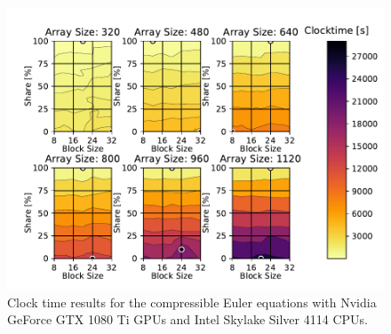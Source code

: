 \documentclass[journal,article,submit,moreauthors,pdftex]{Definitions/mdpi}
\newcommand\fs{1}
\def\oldCPU{Intel Skylake Silver 4114} %
\def\oldGPU{Nvidia GeForce GTX 1080 Ti}
\begin{document}
\begin{figure}
    \widefigure
    \begin{center}
        \includegraphics[scale=\fs, trim={0.5cm 0.4cm 0.5cm 0.2cm},clip]{figs/clockTimeSwepteulerOld.pdf}
        \caption{Clock time results  for the compressible Euler equations with \oldGPU{} GPUs and \oldCPU{} CPUs.}
        \label{fig:clocktimeOldEuler}
    \end{center}
\end{figure}
\end{document}
